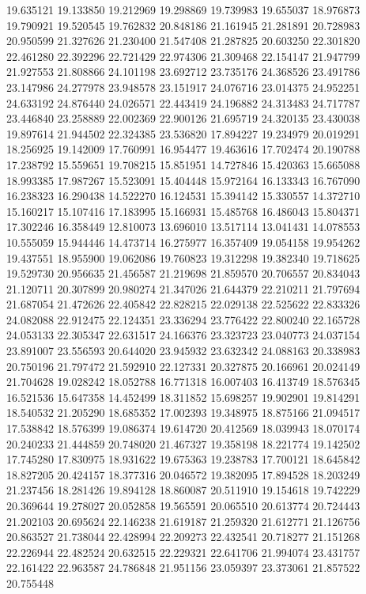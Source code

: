 19.635121
19.133850
19.212969
19.298869
19.739983
19.655037
18.976873
19.790921
19.520545
19.762832
20.848186
21.161945
21.281891
20.728983
20.950599
21.327626
21.230400
21.547408
21.287825
20.603250
22.301820
22.461280
22.392296
22.721429
22.974306
21.309468
22.154147
21.947799
21.927553
21.808866
24.101198
23.692712
23.735176
24.368526
23.491786
23.147986
24.277978
23.948578
23.151917
24.076716
23.014375
24.952251
24.633192
24.876440
24.026571
22.443419
24.196882
24.313483
24.717787
23.446840
23.258889
22.002369
22.900126
21.695719
24.320135
23.430038
19.897614
21.944502
22.324385
23.536820
17.894227
19.234979
20.019291
18.256925
19.142009
17.760991
16.954477
19.463616
17.702474
20.190788
17.238792
15.559651
19.708215
15.851951
14.727846
15.420363
15.665088
18.993385
17.987267
15.523091
15.404448
15.972164
16.133343
16.767090
16.238323
16.290438
14.522270
16.124531
15.394142
15.330557
14.372710
15.160217
15.107416
17.183995
15.166931
15.485768
16.486043
15.804371
17.302246
16.358449
12.810073
13.696010
13.517114
13.041431
14.078553
10.555059
15.944446
14.473714
16.275977
16.357409
19.054158
19.954262
19.437551
18.955900
19.062086
19.760823
19.312298
19.382340
19.718625
19.529730
20.956635
21.456587
21.219698
21.859570
20.706557
20.834043
21.120711
20.307899
20.980274
21.347026
21.644379
22.210211
21.797694
21.687054
21.472626
22.405842
22.828215
22.029138
22.525622
22.833326
24.082088
22.912475
22.124351
23.336294
23.776422
22.800240
22.165728
24.053133
22.305347
22.631517
24.166376
23.323723
23.040773
24.037154
23.891007
23.556593
20.644020
23.945932
23.632342
24.088163
20.338983
20.750196
21.797472
21.592910
22.127331
20.327875
20.166961
20.024149
21.704628
19.028242
18.052788
16.771318
16.007403
16.413749
18.576345
16.521536
15.647358
14.452499
18.311852
15.698257
19.902901
19.814291
18.540532
21.205290
18.685352
17.002393
19.348975
18.875166
21.094517
17.538842
18.576399
19.086374
19.614720
20.412569
18.039943
18.070174
20.240233
21.444859
20.748020
21.467327
19.358198
18.221774
19.142502
17.745280
17.830975
18.931622
19.675363
19.238783
17.700121
18.645842
18.827205
20.424157
18.377316
20.046572
19.382095
17.894528
18.203249
21.237456
18.281426
19.894128
18.860087
20.511910
19.154618
19.742229
20.369644
19.278027
20.052858
19.565591
20.065510
20.613774
20.724443
21.202103
20.695624
22.146238
21.619187
21.259320
21.612771
21.126756
20.863527
21.738044
22.428994
22.209273
22.432541
20.718277
21.151268
22.226944
22.482524
20.632515
22.229321
22.641706
21.994074
23.431757
22.161422
22.963587
24.786848
21.951156
23.059397
23.373061
21.857522
20.755448
